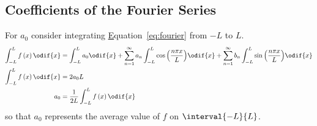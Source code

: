 \documentclass{article}
\begin{document}
\subsection{Coefficients of the Fourier Series}
For \(a_0\) consider integrating \hyperref[eq:fourier]Equation~{\ref{eq:fourier}} from \(-L\) to \(L\).
\begin{align*}
    \int_{-L}^L f\left( x \right) \odif{x} & = \int_{-L}^L a_0 \odif{x} + \sum_{n = 1}^\infty a_n \int_{-L}^L \cos{\left( \frac{n \pi x}{L} \right)} \odif{x} + \sum_{n = 1}^\infty b_n \int_{-L}^L \sin{\left( \frac{n \pi x}{L} \right)} \odif{x} \\
    \int_{-L}^L f\left( x \right) \odif{x} & = 2 a_0 L                                                                                                                                                                                              \\
    a_0                                    & = \frac{1}{2L} \int_{-L}^L f\left( x \right) \odif{x}
\end{align*}
so that \(a_0\) represents the average value of \(f\) on \(\interval{-L}{L}\).
\end{document}
